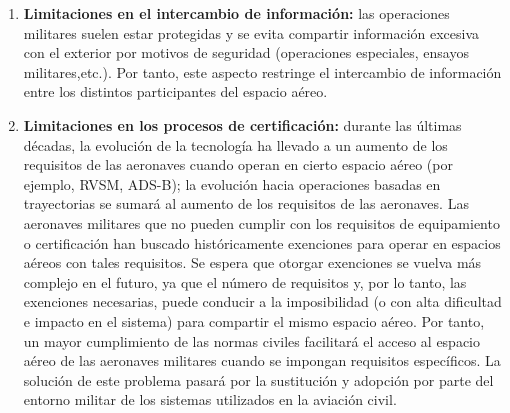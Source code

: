 \begin{enumerate}
    \item \textbf{Limitaciones en el intercambio de información:} las operaciones militares suelen estar protegidas y se evita compartir información excesiva con el exterior por motivos de seguridad (operaciones especiales, ensayos militares,etc.).  Por tanto, este aspecto restringe el intercambio de información entre los distintos participantes del espacio aéreo. 
    
    \item \textbf{Limitaciones en los procesos de certificación:} durante las últimas décadas, la evolución de la tecnología ha llevado a un aumento de los requisitos de las aeronaves cuando operan en cierto espacio aéreo (por ejemplo, RVSM, ADS-B); la evolución hacia operaciones basadas en trayectorias se sumará al aumento de los requisitos de las aeronaves. Las aeronaves militares que no pueden cumplir con los requisitos de equipamiento o certificación han buscado históricamente exenciones para operar en espacios aéreos con tales requisitos. Se espera que otorgar exenciones se vuelva más complejo en el futuro, ya que el número de requisitos y, por lo tanto, las exenciones necesarias, puede conducir a la imposibilidad (o con alta dificultad e impacto en el sistema) para compartir el mismo espacio aéreo. Por tanto, un mayor cumplimiento de las normas civiles facilitará el acceso al espacio aéreo de las aeronaves militares cuando se impongan requisitos específicos. La solución de este problema pasará por la sustitución y adopción por parte del entorno militar de los sistemas utilizados en la aviación civil.
\end{enumerate}